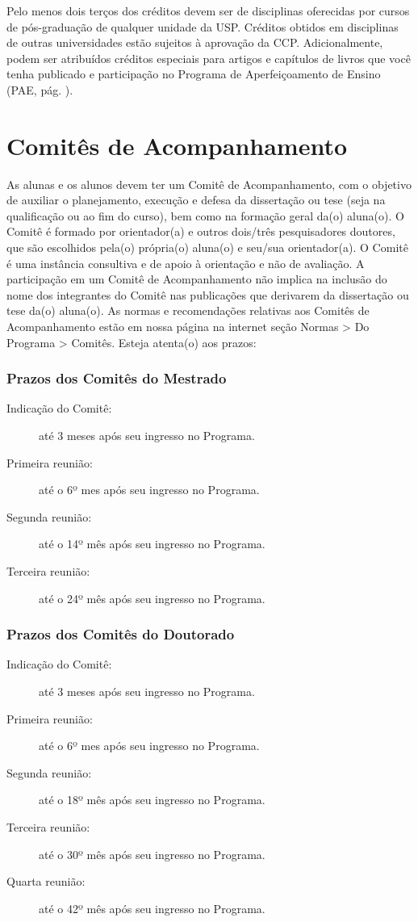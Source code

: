 \documentclass[twoside a4paper 12pt]{report}
\begin{document}
Pelo menos dois terços dos créditos devem ser de disciplinas oferecidas por cursos de pós-graduação de qualquer unidade da USP. Créditos obtidos em disciplinas de outras universidades estão sujeitos à aprovação da CCP. Adicionalmente, podem ser atribuídos créditos especiais para artigos e capítulos de livros que você tenha publicado e participação no Programa de Aperfeiçoamento de Ensino (PAE, pág. \pageref{subsec:pae}).


\section{Comitês de Acompanhamento}
\label{sec:comites}

As alunas e os alunos devem ter um Comitê de Acompanhamento, com o objetivo de auxiliar o planejamento, execução e defesa da dissertação ou tese (seja na qualificação ou ao fim do curso), bem como na formação geral da(o) aluna(o). O Comitê é formado por orientador(a) e outros dois/três pesquisadores doutores, que são escolhidos pela(o) própria(o) aluna(o) e seu/sua orientador(a). O Comitê é uma instância consultiva e de apoio à orientação e não de avaliação. A participação em um Comitê de Acompanhamento não implica na inclusão do nome dos integrantes do Comitê nas publicações que derivarem da dissertação ou tese da(o) aluna(o). As normas e recomendações relativas aos Comitês de Acompanhamento estão em nossa página na internet seção Normas \textgreater{} Do Programa \textgreater{} Comitês. Esteja atenta(o) aos prazos:

\subsubsection{Prazos dos Comitês do Mestrado}
\begin{description}
\item[Indicação do Comitê:] até 3 meses após seu ingresso no Programa.
\item[Primeira reunião:] até o 6º mes após seu ingresso no Programa.
\item[Segunda reunião:] até  o 14º mês após seu ingresso no Programa.
\item[Terceira reunião:] até  o 24º mês após seu ingresso no Programa.
\end{description}

\subsubsection{Prazos dos Comitês do Doutorado}
\begin{description}
\item[Indicação do Comitê:] até 3 meses após seu ingresso no Programa.
\item[Primeira reunião:] até o 6º mes após seu ingresso no Programa.
\item[Segunda reunião:] até  o 18º mês após seu ingresso no Programa.
\item[Terceira reunião:] até  o 30º mês após seu ingresso no Programa.
\item[Quarta reunião:] até  o 42º mês após seu ingresso no Programa.
\end{description}
\end{document}

